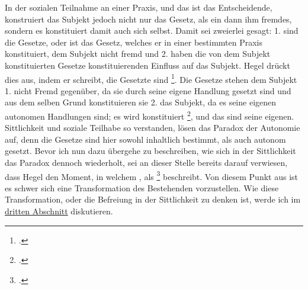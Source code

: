\documentclass[12pt, a4paper, openany]{report}
\begin{document}
In der sozialen Teilnahme an einer Praxis, und das ist das Entscheidende, konstruiert das Subjekt jedoch nicht nur das Gesetz, als ein dann ihm fremdes, sondern es konstituiert damit auch sich selbst. 
Damit sei zweierlei gesagt: 1. sind die Gesetze, oder ist das Gesetz, welches er in einer bestimmten Praxis konstituiert, dem Subjekt nicht fremd und 2. haben die von dem Subjekt konstituierten Gesetze konstituierenden Einfluss auf das Subjekt. 
Hegel drückt dies aus, indem er schreibt, die Gesetzte sind \footcite[][§147, S. 162.]{hegel_grundlinien_2017}.
Die Gesetze stehen dem Subjekt 1. nicht Fremd gegenüber, da sie durch seine eigene Handlung gesetzt sind und aus dem selben Grund konstituieren sie 2. das Subjekt, da es seine eigenen autonomen Handlungen sind;
es wird konstituiert \footcite[][30]{menke_autonomie_2018}, und das sind seine eigenen.
Sittlichkeit und soziale Teilhabe so verstanden, lösen das Paradox der Autonomie auf, denn die Gesetze sind hier sowohl inhaltlich bestimmt, als auch autonom gesetzt.
Bevor ich nun dazu übergehe zu beschreiben, wie sich in der Sittlichkeit das Paradox dennoch wiederholt, sei an dieser Stelle bereits darauf verwiesen, dass Hegel den Moment, in welchem , als \footcite[][§147, S. 163.]{hegel_grundlinien_2017} beschreibt. 
Von diesem Punkt aus ist es schwer sich eine Transformation des Bestehenden vorzustellen.
Wie diese Transformation, oder die Befreiung in der Sittlichkeit zu denken ist, werde ich im \hyperref[abschnitt_3]{dritten Abschnitt} diskutieren.
\end{document}
